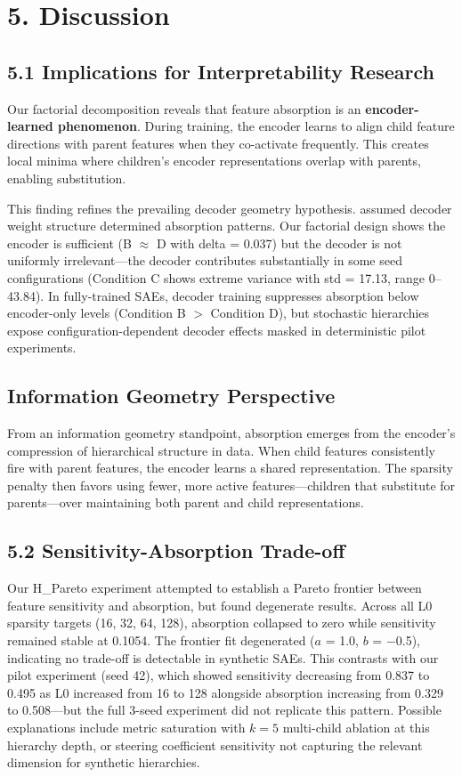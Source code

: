 \documentclass{article}
\begin{document}
\section{5. Discussion}

\subsection{5.1 Implications for Interpretability Research}

Our factorial decomposition reveals that feature absorption is an \textbf{encoder-learned phenomenon}. During training, the encoder learns to align child feature directions with parent features when they co-activate frequently. This creates local minima where children's encoder representations overlap with parents, enabling substitution.

This finding refines the prevailing decoder geometry hypothesis. \citet{chanin2024absorption} assumed decoder weight structure determined absorption patterns. Our factorial design shows the encoder is sufficient (B $\approx$ D with delta = 0.037) but the decoder is not uniformly irrelevant---the decoder contributes substantially in some seed configurations (Condition C shows extreme variance with std = 17.13, range 0--43.84). In fully-trained SAEs, decoder training suppresses absorption below encoder-only levels (Condition B $>$ Condition D), but stochastic hierarchies expose configuration-dependent decoder effects masked in deterministic pilot experiments.

\subsection{Information Geometry Perspective}

From an information geometry standpoint, absorption emerges from the encoder's compression of hierarchical structure in data. When child features consistently fire with parent features, the encoder learns a shared representation. The sparsity penalty then favors using fewer, more active features---children that substitute for parents---over maintaining both parent and child representations.

\subsection{5.2 Sensitivity-Absorption Trade-off}

Our H\_Pareto experiment attempted to establish a Pareto frontier between feature sensitivity and absorption, but found degenerate results. Across all L0 sparsity targets (16, 32, 64, 128), absorption collapsed to zero while sensitivity remained stable at 0.1054. The frontier fit degenerated ($a$ = 1.0, $b$ = $-$0.5), indicating no trade-off is detectable in synthetic SAEs. This contrasts with our pilot experiment (seed 42), which showed sensitivity decreasing from 0.837 to 0.495 as L0 increased from 16 to 128 alongside absorption increasing from 0.329 to 0.508---but the full 3-seed experiment did not replicate this pattern. Possible explanations include metric saturation with $k=5$ multi-child ablation at this hierarchy depth, or steering coefficient sensitivity not capturing the relevant dimension for synthetic hierarchies.
\end{document}
